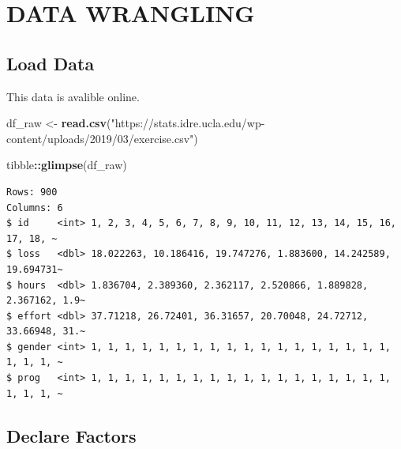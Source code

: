 \documentclass[
]{article}
\newenvironment{Shaded}{\begin{snugshade}}{\end{snugshade}}
\newcommand{\FunctionTok}[1]{\textcolor[rgb]{0.13,0.29,0.53}{\textbf{#1}}}
\newcommand{\NormalTok}[1]{#1}
\newcommand{\OtherTok}[1]{\textcolor[rgb]{0.56,0.35,0.01}{#1}}
\newcommand{\SpecialCharTok}[1]{\textcolor[rgb]{0.81,0.36,0.00}{\textbf{#1}}}
\newcommand{\StringTok}[1]{\textcolor[rgb]{0.31,0.60,0.02}{#1}}
\begin{document}
\clearpage

\hypertarget{data-wrangling}{%
\section{DATA WRANGLING}\label{data-wrangling}}

\hypertarget{load-data}{%
\subsection{Load Data}\label{load-data}}

This data is avalible online.

\begin{Shaded}
\begin{Highlighting}[]
\NormalTok{df\_raw }\OtherTok{\textless{}{-}} \FunctionTok{read.csv}\NormalTok{(}\StringTok{"https://stats.idre.ucla.edu/wp{-}content/uploads/2019/03/exercise.csv"}\NormalTok{)}
\end{Highlighting}
\end{Shaded}

\begin{Shaded}
\begin{Highlighting}[]
\NormalTok{tibble}\SpecialCharTok{::}\FunctionTok{glimpse}\NormalTok{(df\_raw)}
\end{Highlighting}
\end{Shaded}

\begin{verbatim}
Rows: 900
Columns: 6
$ id     <int> 1, 2, 3, 4, 5, 6, 7, 8, 9, 10, 11, 12, 13, 14, 15, 16, 17, 18, ~
$ loss   <dbl> 18.022263, 10.186416, 19.747276, 1.883600, 14.242589, 19.694731~
$ hours  <dbl> 1.836704, 2.389360, 2.362117, 2.520866, 1.889828, 2.367162, 1.9~
$ effort <dbl> 37.71218, 26.72401, 36.31657, 20.70048, 24.72712, 33.66948, 31.~
$ gender <int> 1, 1, 1, 1, 1, 1, 1, 1, 1, 1, 1, 1, 1, 1, 1, 1, 1, 1, 1, 1, 1, ~
$ prog   <int> 1, 1, 1, 1, 1, 1, 1, 1, 1, 1, 1, 1, 1, 1, 1, 1, 1, 1, 1, 1, 1, ~
\end{verbatim}

\hypertarget{declare-factors}{%
\subsection{Declare Factors}\label{declare-factors}}
\end{document}
